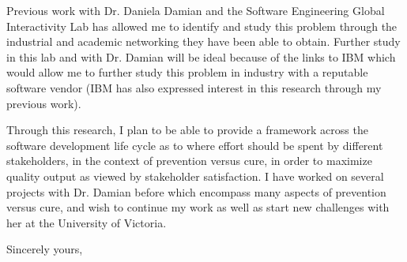 \documentclass[11pt]{letter} %
\begin{document}
\begin{letter}{}
Previous work with Dr. Daniela Damian and the Software Engineering Global Interactivity Lab has allowed me to identify and study this problem through the industrial and academic networking they have been able to obtain. Further study in this lab and with Dr. Damian will be ideal because of the links to IBM which would allow me to further study this problem in industry with a reputable software vendor (IBM has also expressed interest in this research through my previous work).

Through this research, I plan to be able to provide a framework across the software development life cycle as to where effort should be spent by different stakeholders, in the context of prevention versus cure, in order to maximize quality output as viewed by stakeholder satisfaction. I have worked on several projects with Dr. Damian before which encompass many aspects of prevention versus cure, and wish to continue my work as well as start new challenges with her at the University of Victoria.

\closing{Sincerely yours,}



\end{letter}
\end{document}
